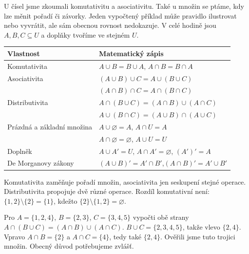\documentclass[11pt,a4paper]{article}
\begin{document}
U čísel jsme zkoumali komutativitu a asociativitu. Také u množin se ptáme,
kdy lze měnit pořadí či závorky. Jeden vypočtený příklad může pravidlo
ilustrovat nebo vyvrátit, ale sám obecnou rovnost nedokazuje.
V celé hodině jsou $A,B,C\subseteq U$ a doplňky tvoříme ve stejném $U$.

\begin{center}
\begin{tabularx}{\linewidth}{@{}l X@{}}
\toprule
Vlastnost & Matematický zápis\\ \midrule
Komutativita & $A\cup B=B\cup A$, \quad $A\cap B=B\cap A$\\
Asociativita & $(A\cup B)\cup C=A\cup(B\cup C)$\\
             & $(A\cap B)\cap C=A\cap(B\cap C)$\\
Distributivita & $A\cap(B\cup C)=(A\cap B)\cup(A\cap C)$\\
              & $A\cup(B\cap C)=(A\cup B)\cap(A\cup C)$\\
Prázdná a základní množina & $A\cup\varnothing=A$, $A\cap U=A$\\
                          & $A\cap\varnothing=\varnothing$, $A\cup U=U$\\
Doplněk & $A\cup A'=U$, $A\cap A'=\varnothing$, $(A')'=A$\\
De Morganovy zákony & $(A\cup B)'=A'\cap B'$,\quad $(A\cap B)'=A'\cup B'$\\
\bottomrule
\end{tabularx}
\end{center}
Komutativita zaměňuje pořadí množin, asociativita jen seskupení stejné operace.
Distributivita propojuje dvě různé operace. Rozdíl komutativní není:
$\{1,2\}\setminus\{2\}=\{1\}$, kdežto $\{2\}\setminus\{1,2\}=\varnothing$.

\begin{prikladReseniBox}[title={P1: konkrétní kontrola distributivity},breakable=false]
Pro $A=\{1,2,4\}$, $B=\{2,3\}$, $C=\{3,4,5\}$ vypočti obě strany
$A\cap(B\cup C)=(A\cap B)\cup(A\cap C)$.
\tcblower
$B\cup C=\{2,3,4,5\}$, takže vlevo $\{2,4\}$.
Vpravo $A\cap B=\{2\}$ a $A\cap C=\{4\}$, tedy také $\{2,4\}$.
Ověřili jsme tuto trojici množin. Obecný důvod potřebujeme zvlášť.
\end{prikladReseniBox}
\end{document}
